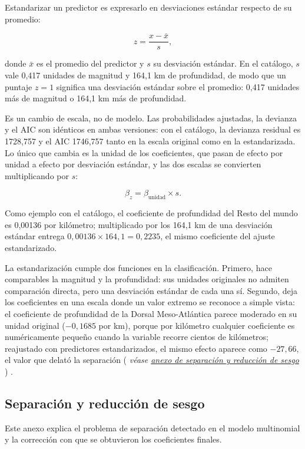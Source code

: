 \documentclass[
  spanish,
  letterpaper,
  DIV=11,
  numbers=noendperiod]{scrartcl}
\newcommand{\asesoriaParenRef}[1]{%
  \textnormal{\textcolor{asesoriaTextColor}{(}}%
  {\hypersetup{linkcolor=asesoriaLinkColor,urlcolor=asesoriaLinkColor,citecolor=asesoriaLinkColor}\textcolor{asesoriaTextColor}{\emph{#1}}}%
  \textnormal{\textcolor{asesoriaTextColor}{)}}%
}
\begin{document}
Estandarizar un predictor es expresarlo en desviaciones estándar
respecto de su promedio:

\[
z=\frac{x-\bar{x}}{s},
\]

donde \(\bar{x}\) es el promedio del predictor y \(s\) su desviación
estándar. En el catálogo, \(s\) vale 0,417 unidades de magnitud y 164,1
km de profundidad, de modo que un puntaje \(z=1\) significa una
desviación estándar sobre el promedio: 0,417 unidades más de magnitud o
164,1 km más de profundidad.

Es un cambio de escala, no de modelo. Las probabilidades ajustadas, la
devianza y el AIC son idénticos en ambas versiones: con el catálogo, la
devianza residual es 1728,757 y el AIC 1746,757 tanto en la escala
original como en la estandarizada. Lo único que cambia es la unidad de
los coeficientes, que pasan de efecto por unidad a efecto por desviación
estándar, y las dos escalas se convierten multiplicando por \(s\):

\[
\beta_{z}=\beta_{\text{unidad}}\times s.
\]

Como ejemplo con el catálogo, el coeficiente de profundidad del Resto
del mundo es 0,00136 por kilómetro; multiplicado por los 164,1 km de una
desviación estándar entrega \(0{,}00136\times 164{,}1=0{,}2235\), el
mismo coeficiente del ajuste estandarizado.

La estandarización cumple dos funciones en la clasificación. Primero,
hace comparables la magnitud y la profundidad: sus unidades originales
no admiten comparación directa, pero una desviación estándar de cada una
sí. Segundo, deja los coeficientes en una escala donde un valor extremo
se reconoce a simple vista: el coeficiente de profundidad de la Dorsal
Meso-Atlántica parece moderado en su unidad original (\(-0{,}1685\) por
km), porque por kilómetro cualquier coeficiente es numéricamente pequeño
cuando la variable recorre cientos de kilómetros; reajustado con
predictores estandarizados, el mismo efecto aparece como \(-27{,}66\),
el valor que delató la separación
\asesoriaParenRef{véase \hyperref[sec-anexo-separacion]{anexo de separación y reducción de sesgo}}.

\subsection{Separación y reducción de sesgo}\label{sec-anexo-separacion}

Este anexo explica el problema de separación detectado en el modelo
multinomial y la corrección con que se obtuvieron los coeficientes
finales.
\end{document}
